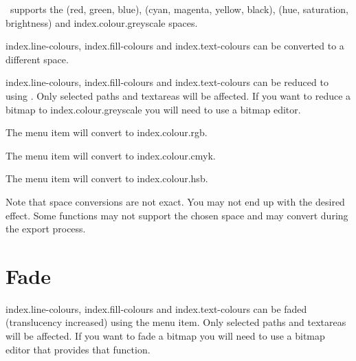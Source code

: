 
\FlowframTk\ supports the
 (red, green, blue),
 (cyan, magenta, yellow, black),
 (hue, saturation, brightness) and
\gls{index.colour.greyscale}  spaces.

\Glspl{index.line-colour}, \glspl{index.fill-colour} and
\glspl{index.text-colour} can be converted to a different
 space.


\Glspl{index.line-colour}, \glspl{index.fill-colour} and
\glspl{index.text-colour} can be reduced to
 using
.  Only selected \glspl{path} and
\glspl{textarea} will be affected. If you want to reduce a
\gls{bitmap} to \gls{index.colour.greyscale} you will need to use a
bitmap editor.


The  menu item will convert to
\gls{index.colour.rgb}.


The  menu item will convert to
\gls{index.colour.cmyk}.


The  menu item will convert to
\gls{index.colour.hsb}.

\begin{warning}
Note that  space conversions are not exact. You may
not end up with the desired effect. Some  functions
may not support the chosen  space and may convert
during the export process.
\end{warning}


\section{Fade}\label{sec:fade}


\Glspl{index.line-colour}, \glspl{index.fill-colour} and
\glspl{index.text-colour} can be faded (\gls{translucency} increased)
using the  menu item. Only selected
\glspl{path} and \glspl{textarea} will be affected. If you want to
fade a \gls{bitmap} you will need to use a bitmap editor that
provides that function.

